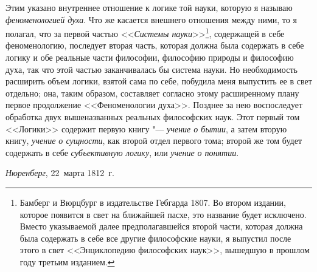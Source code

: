 Этим указано внутреннее отношение к логике той науки, которую я называю
{\em феноменологией духа}. Что же касается внешнего
отношения между ними, то я полагал, что за первой частью
<<{\em Системы науки}>>\footnote{Бамберг и Вюрцбург в
издательстве Гебгарда 1807. Во втором издании, которое появится в свет на
ближайшей пасхе, это название будет исключено. Вместо указываемой далее
предполагавшейся второй части, которая должна была содержать в себе все
другие философские науки, я выпустил после этого в свет <<Энциклопедию
философских наук>>, вышедшую в прошлом году третьим
изданием.},
содержащей в себе феноменологию, последует вторая часть, которая должна
была содержать в себе логику и обе реальные части философии, философию
природы и философию духа, так что этой частью заканчивалась бы система
науки. Но необходимость расширить объем логики, взятой сама по себе,
побудила меня выпустить ее в свет отдельно; она, таким образом, составляет
согласно этому расширенному плану первое продолжение <<Феноменологии духа>>.
Позднее за нею воспоследует обработка двух вышеназванных реальных
философских наук. Этот первый том <<Логики>> содержит первую книгу
"--- {\em учение о бытии}, а затем вторую книгу,
{\em учение о сущности}, как второй отдел первого тома;
второй же том будет содержать в себе {\em субъективную
логику}, или {\em учение о понятии}.

{\em Нюренберг}, 22~марта 1812~г.

\bigskip
